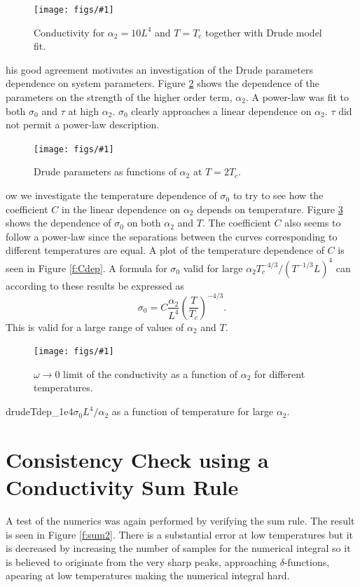 \documentclass[12pt]{report}
\newcommand{\fig}[3]{
\begin{figure}
\centering
\texttt{[image: figs/\#1]}
\caption{#2}
\end{figure}
}
\begin{document}
\fig{drude_T_1Tc_a2_10}{Conductivity for $\alpha_2=10L^4$ and $T=T_c$ together with Drude model fit.\label{f:drude2}}

This good agreement motivates an investigation of the Drude parameters dependence on system parameters. Figure \ref{f:drudeVar} shows the dependence of the parameters on the strength of the higher order term, $\alpha_2$. A power-law was fit to both $\sigma_0$ and $\tau$ at high $\alpha_2$. $\sigma_0$ clearly approaches a linear dependence on $\alpha_2$. $\tau$ did not permit a power-law description.\\
\fig{drudeVara2_T=2Tc}{Drude parameters as functions of $\alpha_2$ at $T=2T_c$.\label{f:drudeVar}}

Now we investigate the temperature dependence of $\sigma_0$ to try to see how the coefficient $C$ in the linear dependence on $\alpha_2$ depends on temperature. Figure \ref{f:drudeVarT} shows the dependence of $\sigma_0$ on both $\alpha_2$ and $T$. The coefficient $C$ also seems to follow a power-law since the separations between the curves corresponding to different temperatures are equal. A plot of the temperature dependence of $C$ is seen in Figure \ref{f:Cdep}. A formula for $\sigma_0$ valid for large $\alpha_2T_c^{-4/3}/(T^{-1/3}L)^4$ can according to these results be expressed as
\begin{equation}
 \sigma_0=C\frac{\alpha_2}{L^4}\left(\frac{T}{T_c}\right)^{-4/3}.
\end{equation}
This is valid for a large range of values of $\alpha_2$ and $T$.

\fig{drudeVarMT}{$\omega\rightarrow0$ limit of the conductivity as a function of $\alpha_2$ for different temperatures.\label{f:drudeVarT}}

\fig{drudeTdep_1e4}{$\sigma_0L^4/\alpha_2$ as a function of temperature for large $\alpha_2$.\label{f:Cdep}}

\section{Consistency Check using a Conductivity Sum Rule}
A test of the numerics was again performed by verifying the sum rule. The result is seen in Figure \ref{f:sum2}.  There is a substantial error at low temperatures but it is decreased by increasing the number of samples for the numerical integral so it is believed to originate from the very sharp peaks, approaching $\delta$-functions, apearing at low temperatures making the numerical integral hard.
\end{document}
